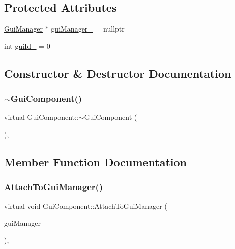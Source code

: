 \subsection*{Protected Attributes}
\begin{DoxyCompactItemize}
\item 
\mbox{\hyperlink{class_gui_manager}{Gui\+Manager}} $\ast$ \mbox{\hyperlink{class_gui_component_a96d148edf9f521cd048b98f749bdf2e5}{gui\+Manager\+\_\+}} = nullptr
\item 
int \mbox{\hyperlink{class_gui_component_a8fb428ee8083cdaf7d1f9729a22bcf84}{gui\+Id\+\_\+}} = 0
\end{DoxyCompactItemize}


\subsection{Constructor \& Destructor Documentation}
\mbox{\label{class_gui_component_a1a24d7d4f14f0bcd7d9f81a397c79f4e}} 
\subsubsection{\texorpdfstring{$\sim$GuiComponent()}{~GuiComponent()}}
{\footnotesize\ttfamily virtual Gui\+Component\+::$\sim$\+Gui\+Component (\begin{DoxyParamCaption}{ }\end{DoxyParamCaption})\hspace{0.3cm}{\ttfamily [inline]}, {\ttfamily [virtual]}}



\subsection{Member Function Documentation}
\mbox{\label{class_gui_component_a34ffc6f2ca0ce6f58c9fb6a2fd3e1a32}} 
\subsubsection{\texorpdfstring{AttachToGuiManager()}{AttachToGuiManager()}}
{\footnotesize\ttfamily virtual void Gui\+Component\+::\+Attach\+To\+Gui\+Manager (\begin{DoxyParamCaption}\item[{\mbox{\hyperlink{class_gui_manager}{Gui\+Manager}} $\ast$}]{gui\+Manager }\end{DoxyParamCaption})\hspace{0.3cm}{\ttfamily [inline]}, {\ttfamily [virtual]}}


